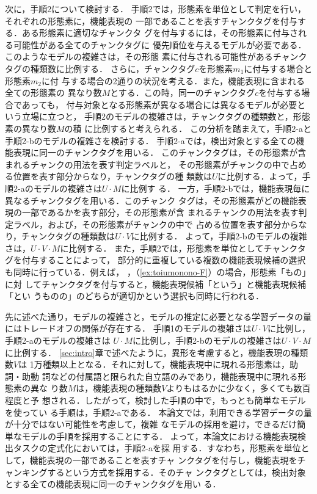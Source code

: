 \documentclass[japanese]{jnlp_1.2d}
\newcommand{\strref}[1]{}
\begin{document}
次に，手順2について検討する．
手順2では，形態素を単位として判定を行い，それぞれの形態素に，機能表現の
一部であることを表すチャンクタグを付与する．ある形態素に適切なチャンクタ
グを付与するには，その形態素に付与される可能性がある全てのチャンクタグに
優先順位を与えるモデルが必要である．このようなモデルの複雑さは，その形態
素に付与される可能性があるチャンクタグの種類数に比例する．
さらに，チャンクタグ$c$を形態素$m_{1}$に付与する場合と形態素$m_{2}$に付
与する場合の2通りの状況を考える．また，機能表現に含まれる全ての形態素の
異なり数$M$とする．この時，同一のチャンクタグ$c$を付与する場合であっても，
付与対象となる形態素が異なる場合には異なるモデルが必要という立場に立つと，
手順2のモデルの複雑さは，チャンクタグの種類数と，形態素の異なり数$M$の積
に比例すると考えられる．
この分析を踏まえて，手順2-aと手順2-bのモデルの複雑さを検討する．
手順2-aでは，検出対象とする全ての機能表現に同一のチャンクタグを用いる．
このチャンクタグは，その形態素が含まれるチャンクの用法を表す判定ラベルと，
その形態素がチャンクの中で占める位置を表す部分からなり，チャンクタグの種
類数は$U$に比例する．よって，手順2-aのモデルの複雑さは$U\cdot M$に比例す
る．
一方，手順2-bでは，機能表現毎に異なるチャンクタグを用いる．このチャンク
タグは，その形態素がどの機能表現の一部であるかを表す部分，その形態素が含
まれるチャンクの用法を表す判定ラベル，および，その形態素がチャンクの中で
占める位置を表す部分からなり，チャンクタグの種類数は$U\cdot V$に比例する．
よって，手順2-bのモデルの複雑さは，$U\cdot V\cdot M$に比例する．
また，手順2では，形態素を単位としてチャンクタグを付与することによって，
部分的に重複している複数の機能表現候補の選択も同時に行っている．例えば，
\strref{ex:toiu-F}，（\ref{ex:toiumonono-F}）の場合，形態素「もの」に対
してチャンクタグを付与すると，機能表現候補「という」と機能表現候補「とい
うものの」のどちらが適切かという選択も同時に行われる．

先に述べた通り，モデルの複雑さと，モデルの推定に必要となる学習データの量
にはトレードオフの関係が存在する．
手順1のモデルの複雑さは$U\cdot V$に比例し，手順2-aのモデルの複雑さは
$U\cdot M$に比例し，手順2-bのモデルの複雑さは$U\cdot V\cdot M$に比例する．
\ref{sec:intro}章で述べたように，異形を考慮すると，機能表現の種類数$V$は
1万種類以上となる．それに対して，機能表現中に現れる形態素は，助詞・助動
詞などの付属語と限られた自立語のみであり，機能表現中に現れる形態素の異な
り数$M$は，機能表現の種類数$V$よりもはるかに少なく，多くても数百程度と予
想される．したがって，検討した手順の中で，もっとも簡単なモデルを使ってい
る手順は，手順2-aである．
本論文では，利用できる学習データの量が十分ではない可能性を考慮して，複雑
なモデルの採用を避け，できるだけ簡単なモデルの手順を採用することにする．
よって，本論文における機能表現検出タスクの定式化においては，手順2-aを採
用する．すなわち，形態素を単位として，機能表現の一部であることを表すチャ
ンクタグを付与し，機能表現をチャンキングするという方式を採用する．そのチャ
ンクタグとしては，検出対象とする全ての機能表現に同一のチャンクタグを用い
る．
\end{document}

